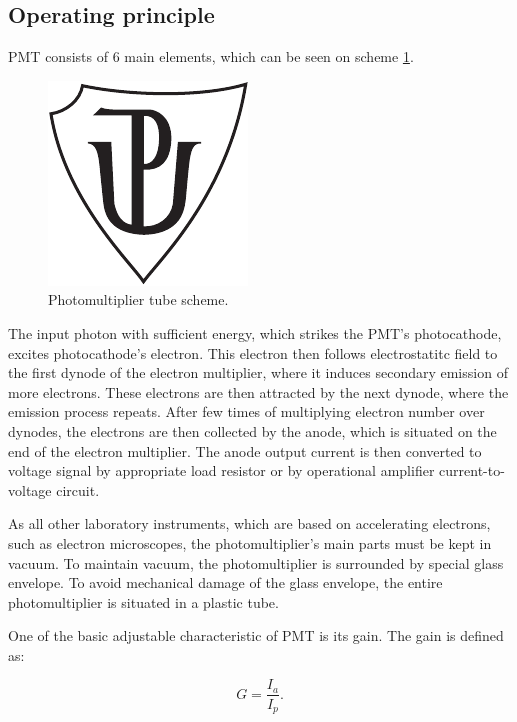 \subsection{Operating principle}
PMT consists of 6 main elements, which can be seen on scheme \ref{PMT scheme}.

\begin{figure}[H]
 \centering
 \includegraphics{up_logo_bw}
 \caption{Photomultiplier tube scheme.}
 \label{PMT scheme}
\end{figure}


\par
The input photon with sufficient energy, which strikes the PMT's photocathode, excites photocathode's electron. This electron then follows electrostatitc field to the first dynode of the electron multiplier, where it induces secondary emission of more electrons. These electrons are then attracted by the next dynode, where the emission process repeats. After few times of multiplying electron number over dynodes, the electrons are then collected by 
the anode, which is situated on the end of the electron multiplier. The anode output current is then converted to voltage signal by appropriate load resistor or by operational amplifier current-to-voltage circuit.
\par
As all other laboratory instruments, which are based on accelerating electrons, such as electron microscopes, the photomultiplier's main parts must be kept in vacuum. To maintain vacuum, the photomultiplier is surrounded by special glass envelope. To avoid mechanical damage of the glass envelope, the entire photomultiplier is situated in a plastic tube.
\par
One of the basic adjustable characteristic of PMT is its gain. The gain is defined as:

\begin{equation}
G = \frac{I_a}{I_p}.
\end{equation}



